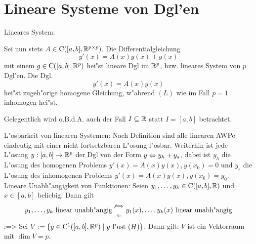 \section{Lineare Systeme von Dgl'en}
 Lineares System:{
%
%
%
%
%
%
%
  Sei nun stets $A\in{\rm C}([a,b],\mathbb R^{p\times p})$. Die 
  Differentialgleichung
  \begin{equation*}
    y'(x)=A(x)y(x)+g(x) \tag{L}
    \end{equation*}
  mit einem $g\in{\rm C}([a,b],\mathbb R^p)$ hei"st lineare Dgl im $\mathbb R^p$,
  bzw. lineares System von $p$ Dgl'en. Die Dgl.
  \begin{equation*}
    y'(x)=A(x)y(x) \tag{H}
    \end{equation*}
  hei"st zugeh"orige homogene Gleichung, w"ahrend $(L)$ wie im Fall $p=1$
  inhomogen hei"st.
  
  Gelegentlich wird o.B.d.A. auch der Fall $I\subseteq\mathbb R$ statt $I=[a,b]$ 
  betrachtet.
  }
\remark L"osbarkeit von linearen Systemen:{
  Nach Definition sind alle linearen AWPe eindeutig mit einer nicht
  fortsetzbaren L"osung l"osbar. Weiterhin ist jede L"osung
  $y:[a,b]\to\mathbb R^p$ der Dgl von der Form $y\ident y_h+y_s$, dabei
  ist $y_h$ die L"osung des homogenen Problems $y'(x)=A(x)y(x),y(x_0)=0$
  und $y_s$ die L"osung des inhomogenen Problems
  $y'(x)=A(x)y(x),y(x_0)=y_0$.
  }
\remark Lineare Unabh"angigkeit von Funktionen:{
  Seien $y_1,\ldots,y_k\in{\rm C}([a,b],\mathbb R)$ und $x\in[a,b]$ beliebig.
  Dann gilt
  \[y_1,\ldots,y_k \text{ linear unabh"angig}\stack(\not\implies;\Leftarrow)
    y_1(x),\ldots,y_k(x)\text{ linear unabh"angig} 
    \]
  }
\theorem:=>{
  Sei $V:=\{y\in{\rm C}^1([a,b],\mathbb R^p)\mid y \text{ l"ost } (H)\}$.
  Dann gilt: $V$ ist ein Vektorraum mit $\dim V=p$.
  }
